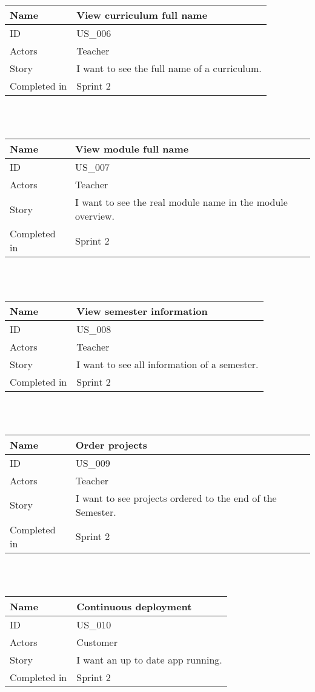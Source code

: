 \documentclass[12pt, a4paper]{article}
\newcommand\addrow[2]{#1 &#2\\ }
\newcommand\tabularhead{\begin{tabular}{lp{8cm}}
		\hline
	}
\newenvironment{usecase}{\tabularhead}
	{\hline\end{tabular}}
\begin{document}
 ~\\
 ~\\
 
 	    \begin{usecase}
 	\addrow{Name}{View curriculum full name}
 	\hline
 	\addrow{ID}{US\_006}
 	\hline
 	\addrow{Actors}{ Teacher }
 	\hline		
 	\addrow{Story}{I want to see the full name of a curriculum.}
 	\hline
 	\addrow{Completed in}{Sprint 2}
 \end{usecase}
 
 ~\\
 ~\\
 
 \begin{usecase}
 	\addrow{Name}{View module full name}
 	\hline
 	\addrow{ID}{US\_007}
 	\hline
 	\addrow{Actors}{ Teacher }
 	\hline		
 	\addrow{Story}{I want to see the real module name in the module overview.}
 	\hline
 	\addrow{Completed in}{Sprint 2}
 \end{usecase}
 
 ~\\
 ~\\
 
 
 \begin{usecase}
 	\addrow{Name}{View semester information}
 	\hline
 	\addrow{ID}{US\_008}
 	\hline
 	\addrow{Actors}{ Teacher }
 	\hline		
 	\addrow{Story}{I want to see all information of a semester.}
 	\hline
 	\addrow{Completed in}{Sprint 2}
 \end{usecase}
 
 ~\\
 ~\\
 
 \begin{usecase}
 	\addrow{Name}{Order projects}
 	\hline
 	\addrow{ID}{US\_009}
 	\hline
 	\addrow{Actors}{ Teacher }
 	\hline		
 	\addrow{Story}{I want to see projects ordered to the end of the Semester.}
 	\hline
 	\addrow{Completed in}{Sprint 2}
 \end{usecase}
 
 ~\\
 ~\\
 
 \begin{usecase}
 	\addrow{Name}{Continuous deployment}
 	\hline
 	\addrow{ID}{US\_010}
 	\hline
 	\addrow{Actors}{ Customer }
 	\hline		
 	\addrow{Story}{I want an up to date app running.}
 	\hline
 	\addrow{Completed in}{Sprint 2}
 \end{usecase}
 
 ~\\
 ~\\
 
\end{document}
